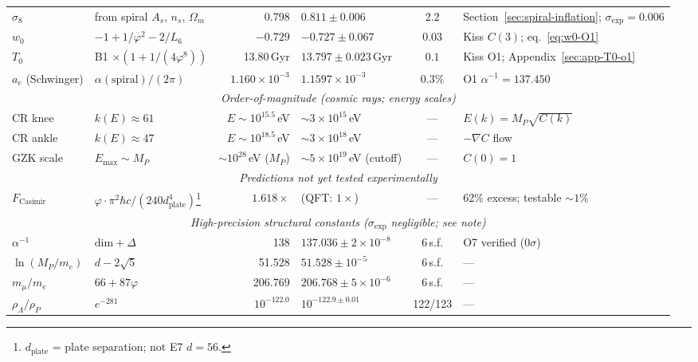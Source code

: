 \documentclass[12pt,a4paper]{article}
\begin{document}
\begin{center}
\begin{tabular}{|l|p{2.1cm}|r|p{2.2cm}|c|p{1.85cm}|}
$\sigma_8$ & from spiral $A_s$, $n_s$, $\Omega_m$ & 0.798 & $0.811 \pm 0.006$ & $2.2$ & Section~\ref{sec:spiral-inflation}; $\sigma_{\mathrm{exp}}=0.006$ \\
$w_0$ & $-1 + 1/\varphi^2 - 2/L_6$ & $-0.729$ & $-0.727 \pm 0.067$ & $0.03$ & Kiss $C(3)$; eq.~\ref{eq:w0-O1} \\
$T_0$ & B1 $\times(1{+}1/(4\varphi^8))$ & 13.80\,Gyr & $13.797 \pm 0.023$\,Gyr & $0.1$ & Kiss O1; Appendix~\ref{sec:app-T0-o1} \\
$a_e$ (Schwinger) & $\alpha(\text{spiral})/(2\pi)$ & $1.160{\times}10^{-3}$ & $1.1597{\times}10^{-3}$ & $0.3\%$ & O1 $\alpha^{-1} = 137.450$ \\
\hline
\multicolumn{6}{|c|}{\textit{Order-of-magnitude (cosmic rays; energy scales)}} \\
\hline
CR knee & $k(E) \approx 61$ & $E \sim 10^{15.5}$\,eV & $\sim 3\times 10^{15}$\,eV & --- & $E(k){=}M_P\sqrt{C(k)}$ \\
CR ankle & $k(E) \approx 47$ & $E \sim 10^{18.5}$\,eV & $\sim 3\times 10^{18}$\,eV & --- & $-\nabla C$ flow \\
GZK scale & $E_{\max} \sim M_P$ & $\sim 10^{28}$\,eV ($M_P$) & $\sim 5{\times}10^{19}$\,eV (cutoff) & --- & $C(0){=}1$ \\
\hline
\multicolumn{6}{|c|}{\textit{Predictions not yet tested experimentally}} \\
\hline
$F_{\mathrm{Casimir}}$ & $\varphi \cdot \pi^2\hbar c/(240d_{\mathrm{plate}}^4)$\footnote{$d_{\mathrm{plate}}$ = plate separation; not E7 $d{=}56$.} & $1.618\times$ & (QFT: $1\times$) & --- & 62\% excess; testable ${\sim}1\%$ \\
\hline
\multicolumn{6}{|c|}{\textit{High-precision structural constants ($\sigma_{\mathrm{exp}}$ negligible; see note)}} \\
\hline
$\alpha^{-1}$ & $\mathrm{dim}{+}\Delta$ & 138 & $137.036 \pm 2{\times}10^{-8}$ & 6\,s.f. & O7 verified ($0\sigma$) \\
$\ln(M_P/m_e)$ & $d - 2\sqrt{5}$ & 51.528 & $51.528 \pm 10^{-5}$ & 6\,s.f. & --- \\
$m_\mu / m_e$ & $66 + 87\varphi$ & 206.769 & $206.768 \pm 5{\times}10^{-6}$ & 6\,s.f. & --- \\
$\rho_\Lambda/\rho_P$ & $e^{-281}$ & $10^{-122.0}$ & $10^{-122.9 \pm 0.01}$ & 122/123 & --- \\
\hline
\end{tabular}
\end{center}
\end{document}
